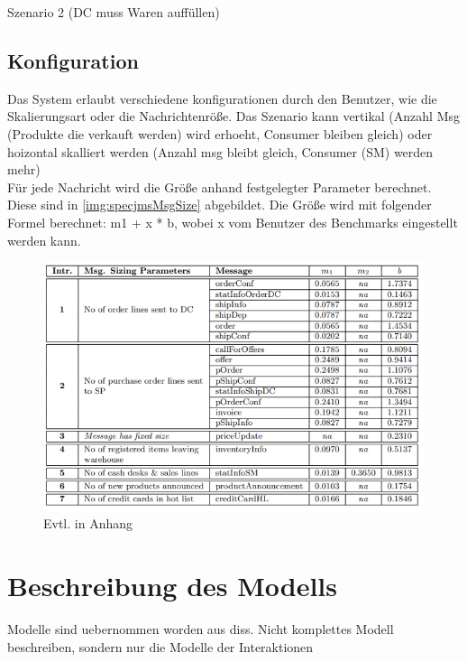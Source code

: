 Szenario 2 (DC muss Waren auffüllen)

\subsection{Konfiguration}
Das System erlaubt verschiedene konfigurationen durch den Benutzer, wie die Skalierungsart oder die Nachrichtenröße. Das Szenario kann vertikal (Anzahl Msg (Produkte die verkauft werden) wird erhoeht, Consumer bleiben gleich) oder
hoizontal skalliert werden (Anzahl msg bleibt gleich, Consumer (SM) werden mehr)\\

Für jede Nachricht wird die Größe anhand festgelegter Parameter berechnet. Diese sind in \autoref{img:specjmsMsgSize} abgebildet. Die Größe wird mit folgender Formel berechnet: m1 + x * b, wobei x vom Benutzer des Benchmarks eingestellt werden kann.

\begin{figure}
\center
  \includegraphics[width=1\textwidth]{images/specjmsmsgsize.png}
  \caption{Evtl. in Anhang}
  \label{img:specjmsMsgSize}
\end{figure}

\section{Beschreibung des Modells}
Modelle sind uebernommen worden aus diss. Nicht komplettes Modell beschreiben, sondern nur die Modelle der Interaktionen

